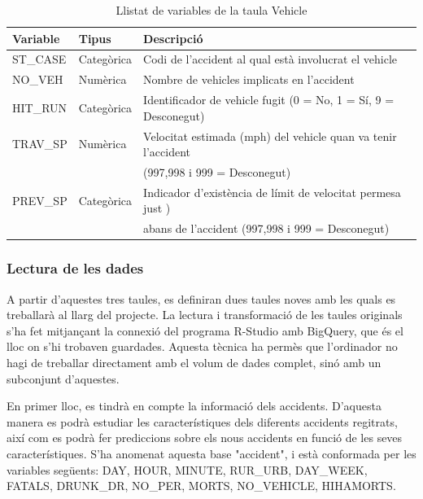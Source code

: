 \documentclass[12pt,longbibliography]{article}
\theoremstyle{definition}
\theoremstyle{remark}
\begin{document}
\begin{table}[H]
\centering
\begin{tabular}{|l|l|l|}
\hline
\textbf{Variable} & \textbf{Tipus} & \textbf{Descripció}                                             \\\hline
ST\_CASE           & Categòrica     & Codi de l’accident al qual està involucrat el vehicle           \\
NO\_VEH            & Numèrica       & Nombre de vehicles implicats en l'accident                      \\
HIT\_RUN           & Categòrica     & Identificador de vehicle fugit (0 = No, 1 = Sí, 9 = Desconegut) \\
TRAV\_SP & Numèrica   & Velocitat estimada (mph) del vehicle quan va tenir l’accident                \\
                &                    & (997,998 i 999 = Desconegut)                 \\
PREV\_SP & Categòrica & Indicador d’existència de límit de velocitat permesa just ) \\
                &                    & abans de l’accident (997,998 i 999 = Desconegut) \\ \hline
\end{tabular}
\caption{\label{vehicle-table}Llistat de variables de la taula Vehicle}
\end{table}

\subsubsection{Lectura de les dades}

A partir d'aquestes tres taules, es definiran dues taules noves amb les quals es treballarà al llarg del projecte. La lectura i transformació de les taules originals s'ha fet mitjançant la connexió del programa R-Studio amb BigQuery, que és el lloc on s'hi trobaven guardades. Aquesta tècnica ha permès que l'ordinador no hagi de treballar directament amb el volum de dades complet, sinó amb un subconjunt d'aquestes.


En primer lloc, es tindrà en compte la informació dels accidents. D'aquesta manera es podrà estudiar les característiques dels diferents accidents regitrats, així com es podrà fer prediccions sobre els nous accidents en funció de les seves característiques. S'ha anomenat aquesta base "accident", i està conformada per les variables següents: DAY, HOUR, MINUTE, RUR\_URB, DAY\_WEEK, FATALS, DRUNK\_DR, NO\_PER, MORTS, NO\_VEHICLE, HIHAMORTS.
\end{document}
